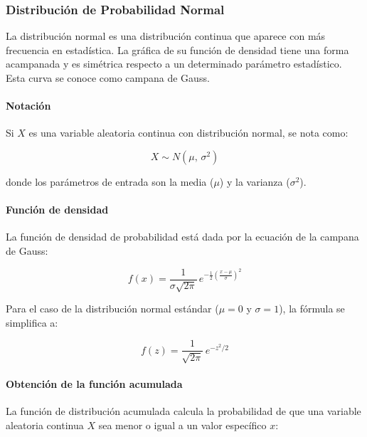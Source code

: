 \documentclass{article}
\begin{document}
\subsubsection{Distribución de Probabilidad Normal}

La distribución normal es una distribución continua que aparece con más frecuencia en
estadística. La gráfica de su función de densidad tiene una forma acampanada y es
simétrica respecto a un determinado parámetro estadístico. Esta curva se conoce como
campana de Gauss.

\paragraph{Notación}

Si $X$ es una variable aleatoria continua con distribución normal, se nota como:

\begin{equation}
    X \sim N(\mu,\, \sigma^2)
\end{equation}

donde los parámetros de entrada son la media ($\mu$) y la varianza ($\sigma^2$).

\paragraph{Función de densidad}

La función de densidad de probabilidad está dada por la ecuación de la campana de Gauss:

\begin{equation}
    f(x) = \frac{1}{\sigma\sqrt{2\pi}}\, e^{-\frac{1}{2}\left(\frac{x - \mu}{\sigma}\right)^2}
\end{equation}

Para el caso de la distribución normal estándar ($\mu = 0$ y $\sigma = 1$), la fórmula se simplifica a:

\begin{equation}
    f(z) = \frac{1}{\sqrt{2\pi}}\, e^{-z^2/2}
\end{equation}

\paragraph{Obtención de la función acumulada}

La función de distribución acumulada calcula la probabilidad de que una variable aleatoria
continua $X$ sea menor o igual a un valor específico $x$:
\end{document}
